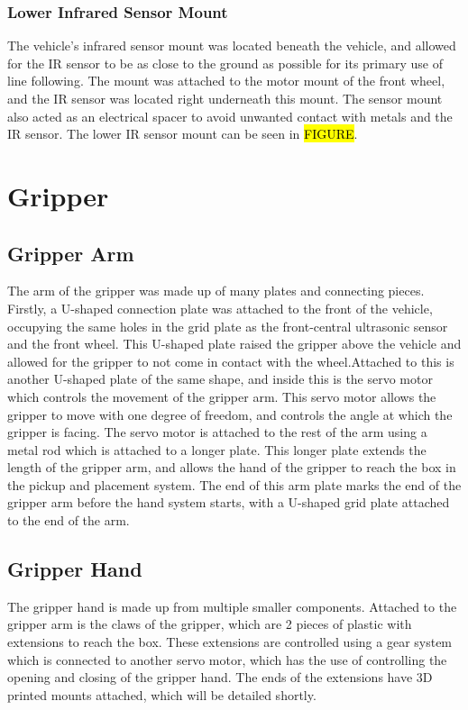 \documentclass[11pt]{report}
\begin{document}
\subsubsection{Lower Infrared Sensor Mount}
The vehicle’s infrared sensor mount was located beneath the vehicle, and allowed for the \gls{IR} sensor to be as close to the ground as possible for its primary use of line following. The mount was attached to the motor mount of the front wheel, and the \gls{IR} sensor was located right underneath this mount. The sensor mount also acted as an electrical spacer to avoid unwanted contact with metals and the \gls{IR} sensor. The lower \gls{IR} sensor mount can be seen in \hl{FIGURE}. 
\section{Gripper}
\subsection{Gripper Arm}
The arm of the gripper was made up of many plates and connecting pieces. Firstly, a U-shaped connection plate was attached to the front of the vehicle, occupying the same holes in the grid plate as the front-central ultrasonic sensor and the front wheel. This U-shaped plate raised the gripper above the vehicle and allowed for the gripper to not come in contact with the wheel.Attached to this is another U-shaped plate of the same shape, and inside this is the servo motor which controls the movement of the gripper arm. This servo motor allows the gripper to move with one degree of freedom, and controls the angle at which the gripper is facing. The servo motor is attached to the rest of the arm using a metal rod which is attached to a longer plate. This longer plate extends the length of the gripper arm, and allows the hand of the gripper to reach the box in the pickup and placement system. The end of this arm plate marks the end of the gripper arm before the hand system starts, with a U-shaped grid plate attached to the end of the arm. 
\subsection{Gripper Hand}
The gripper hand is made up from multiple smaller components. Attached to the gripper arm is the claws of the gripper, which are 2 pieces of plastic with extensions to reach the box. These extensions are controlled using a gear system which is connected to another servo motor, which has the use of controlling the opening and closing of the gripper hand. The ends of the extensions have 3D printed mounts attached, which will be detailed shortly. 
\end{document}
